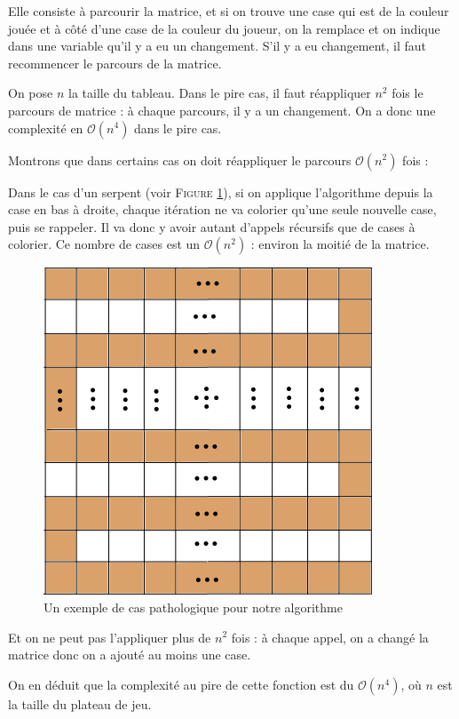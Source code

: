 \documentclass[12pt]{article}
\begin{document}
Elle consiste à parcourir la matrice, et si on trouve une case qui est de la couleur jouée et à côté d'une case de la couleur du joueur, on la remplace et on indique dans une variable qu'il y a eu un changement.
S'il y a eu changement, il faut recommencer le parcours de la matrice.

On pose $n$ la taille du tableau. Dans le pire cas, il faut réappliquer $n^2$ fois le parcours de matrice : à chaque parcours, il y a un changement. On a donc une complexité en $\mathcal{O}(n^4)$ dans le pire cas.

Montrons que dans certains cas on doit réappliquer le parcours $\mathcal{O}(n^2)$ fois :

Dans le cas d'un serpent (voir \textsc{Figure }\ref{serpent}), si on applique l'algorithme depuis la case en bas à droite, chaque itération ne va colorier qu'une seule nouvelle case, puis se rappeler. Il va donc y avoir autant d'appels récursifs que de cases à colorier. Ce nombre de cases est un $\mathcal{O}(n^2)$ : environ la moitié de la matrice.

\begin{figure}
\center
\includegraphics[scale = 0.6]{serpent.png}
\caption{Un exemple de cas pathologique pour notre algorithme}
\label{serpent}
\end{figure}

Et on ne peut pas l'appliquer plus de $n^2$ fois : à chaque appel, on a changé la matrice donc on a ajouté au moins une case.

On en déduit que la complexité au pire de cette fonction est du $\mathcal{O}(n^4)$, où $n$ est la taille du plateau de jeu.
\end{document}
